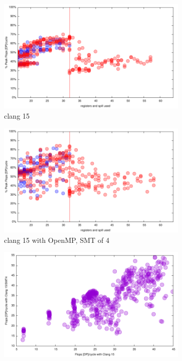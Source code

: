 \documentclass[sigconf,review]{acmart}
\begin{document}
\begin{figure}[ht]
  \begin{subfigure}[h]{0.45\textwidth}
  \includegraphics[width=\textwidth]{../benches/gemm/arm-64x256x64/greedy.pdf}
  \caption{clang 15}
  \end{subfigure}
  \begin{subfigure}[h]{0.45\textwidth}  
\includegraphics[width=\textwidth]{../benches/gemm/arm-64x256x64/openmp.pdf}
  \caption{clang 15 with OpenMP, SMT of 4}
  \end{subfigure}
  \begin{subfigure}[h]{0.45\textwidth}  
\includegraphics[width=\textwidth]{../benches/gemm/arm-64x256x64/clangxsmt.pdf}

\end{subfigure}
\end{figure}
\end{document}
